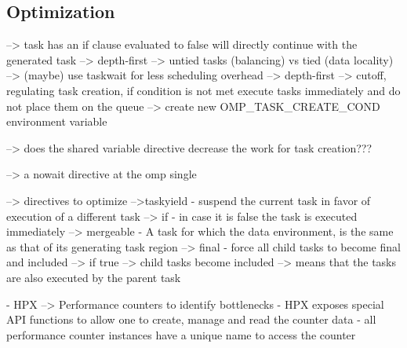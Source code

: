 \subsection{Optimization}
	
	\cite{LaGrone.2011}
	--> task has an if clause evaluated to false will directly continue with the generated task --> depth-first
	--> untied tasks (balancing) vs tied (data locality)
	--> (maybe) use taskwait for less scheduling overhead --> depth-first
	--> cutoff, regulating task creation, if condition is not met execute tasks immediately and do not place them on the queue
		--> create new OMP\_TASK\_CREATE\_COND environment variable
		
    --> does the shared variable directive decrease the work for task creation???
    
    --> a nowait directive at the omp single
    
    \cite{MKlemm.2018}
 --> directives to optimize
 	-->taskyield - suspend the current task in favor of execution of a different task
 	--> if - in case it is false the task is executed immediately
 	--> mergeable - A task for which the data environment, is the same as that of its generating task region
 	--> final - force all child tasks to become final and included
 		--> if true --> child tasks become included --> means that the tasks are also executed by the parent task

  \cite{TheSTEARGroup.2020}
    - HPX --> Performance counters to identify bottlenecks
    - HPX exposes special API functions to allow one to create, manage and read the counter data
    - all performance counter instances have a unique name to access the counter
